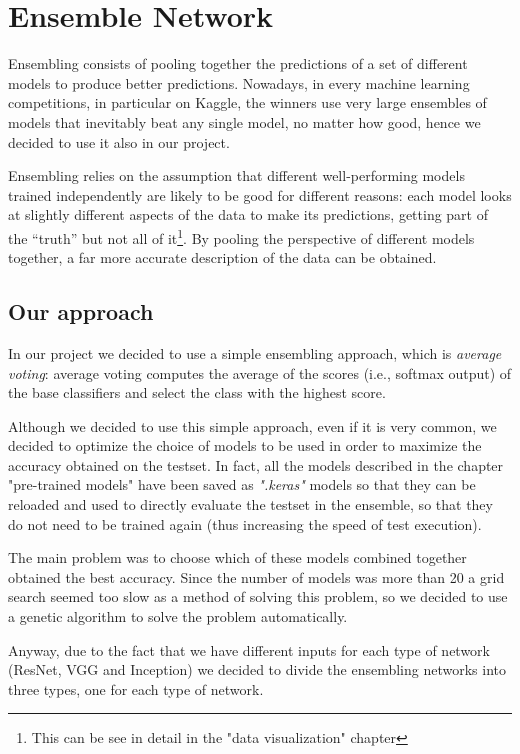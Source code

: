 \section{Ensemble Network}
 Ensembling consists of pooling together the predictions of a set of different models to produce better predictions. Nowadays, in every machine learning competitions, in particular on Kaggle, the winners use very large ensembles of models that inevitably beat any single model, no matter how good, hence we decided to use it also in our project.
 
 
Ensembling relies on the assumption that different well-performing models trained independently are likely to be good for different reasons: each model looks at slightly different aspects of the data to make its predictions, getting part of the “truth” but not all of it\footnote{This can be see in detail in the "data visualization" chapter}. By pooling the perspective of different models together, a far more accurate description of the data can be obtained.

\subsection{Our approach}
In our project we decided to use a simple ensembling approach, which is \textit{average voting}: average voting computes the average of the scores (i.e., softmax output) of the base classifiers and select the class with the highest score.

Although we decided to use this simple approach, even if it is very common, we decided to optimize the choice of models to be used in order to maximize the accuracy obtained on the testset. In fact, all the models described in the chapter "pre-trained models" have been saved as \textit{".keras"} models so that they can be reloaded and used to directly evaluate the testset in the ensemble, so that they do not need to be trained again (thus increasing the speed of test execution).

The main problem was to choose which of these models combined together obtained the best accuracy. Since the number of models was more than 20 a grid search seemed too slow as a method of solving this problem, so we decided to use a genetic algorithm to solve the problem automatically.

Anyway, due to the fact that we have different inputs for each type of network (ResNet, VGG and Inception) we decided to divide the ensembling networks into three types, one for each type of network.


